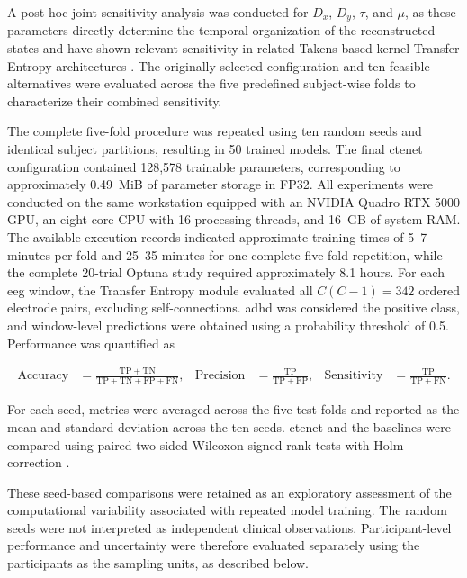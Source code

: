 {A post hoc joint sensitivity analysis was conducted for $D_x$, $D_y$, $\tau$, and $\mu$, as these parameters directly determine the temporal organization of the reconstructed states and have shown relevant sensitivity in related Takens-based kernel Transfer Entropy architectures \cite{gomezrivera2025tektenet}. The originally selected configuration and ten feasible alternatives were evaluated across the five predefined subject-wise folds to characterize their combined sensitivity.}

The complete five-fold procedure was repeated using ten random seeds and identical subject partitions, resulting in 50 trained models. {The final \gls{ctenet} configuration contained 128,578 trainable parameters, corresponding to approximately 0.49~MiB of parameter storage in FP32. All experiments were conducted on the same workstation equipped with an NVIDIA Quadro RTX 5000 GPU, an eight-core CPU with 16 processing threads, and 16~GB of system RAM. The available execution records indicated approximate training times of 5--7 minutes per fold and 25--35 minutes for one complete five-fold repetition, while the complete 20-trial Optuna study required approximately 8.1 hours. For each \gls{eeg} window, the Transfer Entropy module evaluated all $C(C-1)=342$ ordered electrode pairs, excluding self-connections.} \gls{adhd} was considered the positive class, and window-level predictions were obtained using a probability threshold of 0.5. Performance was quantified as

\begin{equation}
\begin{aligned}
\mathrm{Accuracy}
&=\frac{\mathrm{TP}+\mathrm{TN}}
        {\mathrm{TP}+\mathrm{TN}+\mathrm{FP}+\mathrm{FN}},
&
\mathrm{Precision}
&=\frac{\mathrm{TP}}{\mathrm{TP}+\mathrm{FP}},
&
\mathrm{Sensitivity}
&=\frac{\mathrm{TP}}{\mathrm{TP}+\mathrm{FN}}.
\end{aligned}
\label{eq:classification_metrics}
\end{equation}

For each seed, metrics were averaged across the five test folds and reported as the mean and standard deviation across the ten seeds. \gls{ctenet} and the baselines were compared using paired two-sided Wilcoxon signed-rank tests with Holm correction {\cite{holm1979sequentially}}.

{These seed-based comparisons were retained as an exploratory assessment of the computational variability associated with repeated model training. The random seeds were not interpreted as independent clinical observations. Participant-level performance and uncertainty were therefore evaluated separately using the participants as the sampling units, as described below.}

